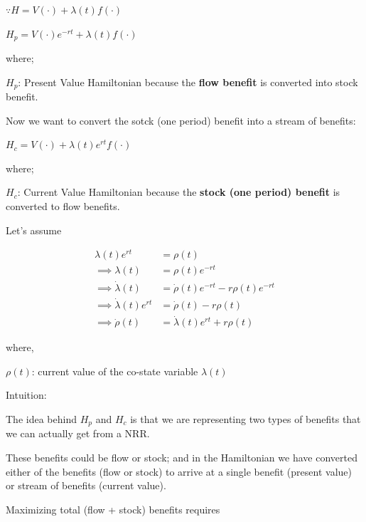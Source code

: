 \documentclass[
  ignorenonframetext,
]{beamer}
\begin{document}
\begin{frame}
\(\because H = V(\cdot) + \lambda (t)f(\cdot)\)

\(H_p = V(\cdot)e^{-rt} + \lambda (t)f(\cdot)\)

where;

\(H_p\): Present Value Hamiltonian because the \textbf{flow benefit} is
converted into stock benefit.
\end{frame}

\begin{frame}
Now we want to convert the sotck (one period) benefit into a stream of
benefits:

\(H_c = V(\cdot) + \lambda (t)e^{rt}f(\cdot)\)

where;

\(H_c\): Current Value Hamiltonian because the \textbf{stock (one
period) benefit} is converted to flow benefits.
\end{frame}

\begin{frame}
Let's assume

\begin{align}
\lambda(t)e^{rt} &= \rho (t)\\
\implies \lambda(t) &= \rho(t) e^{-rt} \\
\implies \dot{\lambda}(t) &= \dot{\rho}(t) e^{-rt} - r\rho(t)e^{-rt}\\
\implies \dot{\lambda}(t)e^{rt} &= \dot{\rho}(t)  - r\rho(t)\\ 
\implies \dot{\rho}(t) &= \dot{\lambda}(t)e^{rt} + r\rho(t)
\end{align}

where,

\(\rho(t)\): current value of the co-state variable \(\lambda(t)\)
\end{frame}

\begin{frame}
Intuition:

The idea behind \(H_p\) and \(H_c\) is that we are representing two
types of benefits that we can actually get from a NRR.

These benefits could be flow or stock; and in the Hamiltonian we have
converted either of the benefits (flow or stock) to arrive at a single
benefit (present value) or stream of benefits (current value).
\end{frame}

\begin{frame}
Maximizing total (flow + stock) benefits requires
\end{frame}
\end{document}

